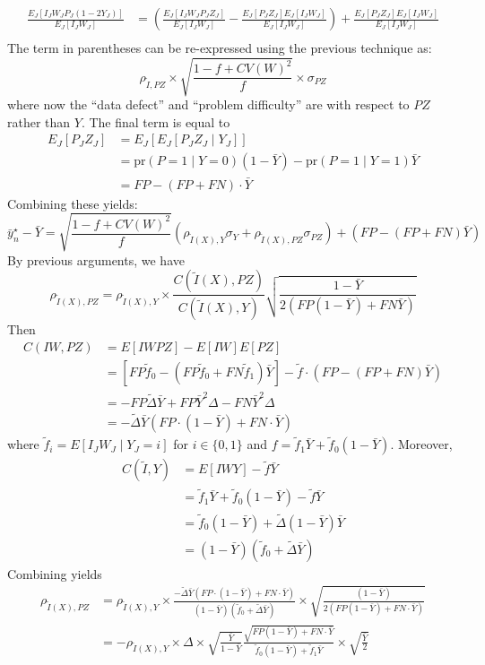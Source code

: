 \documentclass[12pt]{amsart}
\numberwithin{equation}{section}
\theoremstyle{plain}
\def\pr{\text{pr}}
\begin{document}
$$
\begin{aligned}
\frac{E_J \left[ I_J W_J P_J (1-2Y_J) \right]}{E_J [ I_J W_J ] } &= \left( \frac{E_J \left[ I_J W_J P_J Z_J \right]}{E_J [ I_J W_J ] } -  \frac{E_J \left[ P_J Z_J \right] E_J[ I_J W_J]}{E_J [ I_J W_J ] } \right) +  \frac{E_J \left[ P_J Z_J \right] E_J[ I_J W_J]}{E_J [ I_J W_J ] } \\
\end{aligned}
$$
The term in parentheses can be re-expressed using the previous technique as:
$$
\rho_{\tilde I, PZ} \times \sqrt{\frac{1-f+CV(W)^2}{f}} \times \sigma_{PZ}
$$
where now the ``data defect'' and ``problem difficulty'' are with respect to $PZ$ rather than $Y$. The final term is equal to
$$
\begin{aligned}
E_J [P_J Z_J ] &= E_J [ E_J [ P_J Z_J \mid Y_J ] ] \\
&= \pr (P = 1 \mid Y = 0) (1-\bar Y) - \pr(P=1 \mid Y = 1) \bar Y \\
&= FP - (FP + FN) \cdot \bar Y
\end{aligned}
$$
Combining these yields:
$$
\bar y_n^\star - \bar Y = \sqrt{\frac{1-f+CV(W)^2}{f}} \left(\rho_{\tilde I(X),Y} \sigma_Y + \rho_{\tilde I(X), PZ} \sigma_{PZ} \right) + \left( FP - (FP+FN) \bar Y \right)
$$
By previous arguments, we have
$$
\rho_{\tilde I (X), PZ} = \rho_{\tilde I(X), Y} \times \frac{C(\tilde I(X), PZ)}{C(\tilde I(X), Y)} \sqrt{ \frac{1-\bar Y}{ 2 (FP(1-\bar Y) + FN \bar Y)} }
$$
Then
\begin{align*}
C(IW, PZ) &= E[IWPZ] - E[IW] E[PZ] \\
&=  [FP \tilde f_0  - (FP \tilde f_0 + FN \tilde f_1) \bar Y]  - \tilde f \cdot ( FP - (FP+FN) \bar Y )\\
&= -FP \tilde \Delta \bar Y + FP \bar Y^2 \Delta - FN \bar Y^2 \Delta \\
&= -\tilde \Delta \bar Y ( FP \cdot (1-\bar Y) + FN \cdot \bar Y)
\end{align*}
where $\tilde f_i = E[ I_J W_J \mid Y_J = i]$ for $i \in \{0,1 \}$ and $f = \tilde f_1 \bar Y + \tilde f_0 (1-\bar Y)$. Moreover,
\begin{align*}
C(\tilde I,Y) &= E[ I W Y ] - \tilde f \bar Y \\
&= \tilde f_1 \bar Y + \tilde f_0 (1-\bar Y) - \tilde f \bar Y \\
&= \tilde f_0 (1-\bar Y) + \tilde \Delta (1-\bar Y) \bar Y \\
&= (1- \bar Y) (\tilde f_0 + \tilde \Delta \bar Y)
\end{align*}
Combining yields
$$
\begin{aligned}
\rho_{\tilde I (X),PZ} &= \rho_{\tilde I(X),Y} \times \frac{- \tilde \Delta \bar Y (FP \cdot (1-\bar Y) + FN \cdot \bar Y) }{(1-\bar Y) (\tilde f_0 + \tilde \Delta \bar Y)} \times \sqrt{ \frac{(1-\bar Y)}{2 ( FP (1-\bar Y) + FN \cdot \bar Y)} } \\
&= - \rho_{\tilde I(X), Y} \times \Delta \times \sqrt{\frac{\bar Y}{1-\bar Y}} \frac{\sqrt{FP(1-\bar Y) + FN \cdot \bar Y}}{\tilde f_0 (1-\bar Y) + \tilde f_1 \bar Y} \times \sqrt{\frac{\bar Y}{2}}
\end{aligned}
$$
\end{document}
